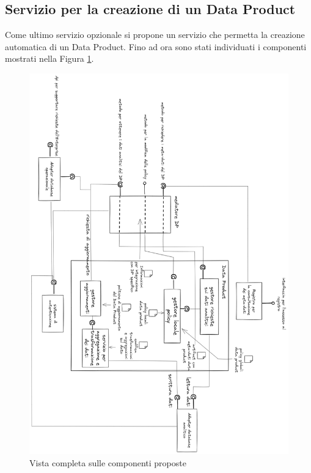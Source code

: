 \documentclass[12pt]{report}
\begin{document}
\subsection{Servizio per la creazione di un Data Product}
Come ultimo servizio opzionale si propone un servizio che permetta la creazione automatica di un Data Product.
Fino ad ora sono stati individuati i componenti mostrati nella Figura \ref{fig:architettura completa}.
\begin{figure}[]
    \centering
    \includegraphics[width=\linewidth]{immagini/disegno completo architettura 2024-03-12 18.03.16.excalidraw.png}
    \caption{Vista completa sulle componenti proposte}
    \label{fig:architettura completa}
\end{figure}
\end{document}
